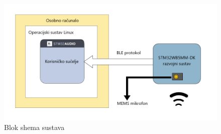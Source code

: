 \begin{figure}[ht]
	\includegraphics[width=\linewidth]{imgs/shema}
	\caption{Blok shema sustava}
	\label{fig:shema}
\end{figure}

